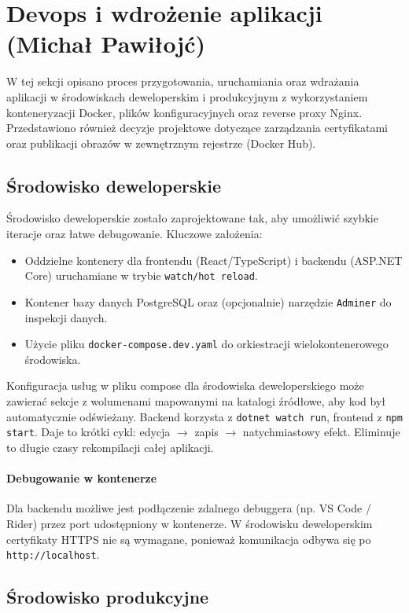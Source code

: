 \section{Devops i wdrożenie aplikacji (Michał Pawiłojć)}

W tej sekcji opisano proces przygotowania, uruchamiania oraz wdrażania aplikacji w środowiskach deweloperskim i produkcyjnym z wykorzystaniem konteneryzacji Docker, plików konfiguracyjnych oraz reverse proxy Nginx. Przedstawiono również decyzje projektowe dotyczące zarządzania certyfikatami oraz publikacji obrazów w zewnętrznym rejestrze (Docker Hub).

\subsection{Środowisko deweloperskie}

Środowisko deweloperskie zostało zaprojektowane tak, aby umożliwić szybkie iteracje oraz łatwe debugowanie. Kluczowe założenia:
\begin{itemize}
    \item Oddzielne kontenery dla frontendu (React/TypeScript) i backendu (ASP.NET Core) uruchamiane w trybie \texttt{watch/hot reload}.
    \item Kontener bazy danych PostgreSQL oraz (opcjonalnie) narzędzie \texttt{Adminer} do inspekcji danych.
    \item Użycie pliku \texttt{docker-compose.dev.yaml} do orkiestracji wielokontenerowego środowiska.
\end{itemize}
\bigskip
Konfiguracja usług w pliku compose dla środowiska deweloperskiego może zawierać sekcje z wolumenami mapowanymi na katalogi źródłowe, aby kod był automatycznie odświeżany. Backend korzysta z \texttt{dotnet watch run}, frontend z \texttt{npm start}. Daje to krótki cykl: edycja $\rightarrow$ zapis $\rightarrow$ natychmiastowy efekt. Eliminuje to długie czasy rekompilacji całej aplikacji.

\paragraph{Debugowanie w kontenerze} Dla backendu możliwe jest podłączenie zdalnego debuggera (np. VS Code / Rider) przez port udostępniony w kontenerze. W środowisku deweloperskim certyfikaty HTTPS nie są wymagane, ponieważ komunikacja odbywa się po \texttt{http://localhost}.

\pagebreak

\subsection{Środowisko produkcyjne}

